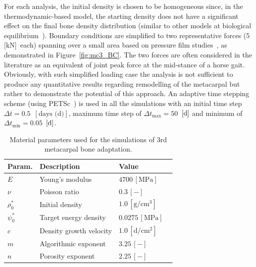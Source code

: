 \documentclass[twocolumn]{svjour3}
\begin{document}
For each analysis, the initial density is chosen to be homogeneous since, in the thermodynamic-based model, the starting density does not have a significant effect on the final bone density distribution (similar to other models at biological equilibrium~\cite{kuhl2003theory}). %
Boundary conditions are simplified to two representative forces (5~$\text{[kN]}$~each) spanning over a small area based on pressure film studies~\cite{Brama2001}, as demonstrated in Figure~\ref{fig:mc3_BC}. 
The two forces are often considered in the literature as an equivalent of joint peak force at the mid-stance of a horse gait. Obviously, with such simplified loading case the analysis is not sufficient to produce any quantitative results regarding remodelling of the metacarpal but rather to demonstrate the potential of this approach. 
An adaptive time stepping scheme (using PETSc~\cite{petsc-web}) is used in all the simulations with an initial time step $\Delta t = 0.5$~$[\text{days (d)}]$, maximum time step of $\Delta t_{\text{max}} = 50$~$[\text d]$ and minimum of $\Delta t_{\text {min}} = 0.05$~$[\text d]$.
\begin{table}[h]
	\centering
	\begin{tabular}{lll}
		\hline
		 Param.             & Description                  & Value  \\ \hline
		$E  $                 & Young's modulus              & $4700 \,\mathrm{ [MPa]}$ ~\cite{Les1994} \\
		$\nu  $               & Poisson ratio                & $0.3 \,\mathrm{ [-]}$ \\
		$\rho_0 ^\ast  $      & Initial density              & $1.0 \,\mathrm{[ g/cm^{3}]}$  \\
		$\psi_{0}^\ast $      & Target energy density        & $0.0275\,\mathrm{ [MPa]}$  ~\cite{Waffenschmidt2012}  \\
		$c$                   & Density growth velocity      & $1.0 \,\mathrm{ [d/cm^{2}]}$   \\
		$m$                   & Algorithmic exponent         & $ 3.25 \,\mathrm{ [-]}$          \\
		$n$                   & Porosity exponent            & $2.25 \,\mathrm{ [-]}$     ~\cite{Les1994}   \\ 
		\hline
	\end{tabular} 
	\caption{Material parameters used for the simulations of 3rd metacarpal bone adaptation.}
	\label{tab:parameters_mc3}
\end{table}
% 
\end{document}
